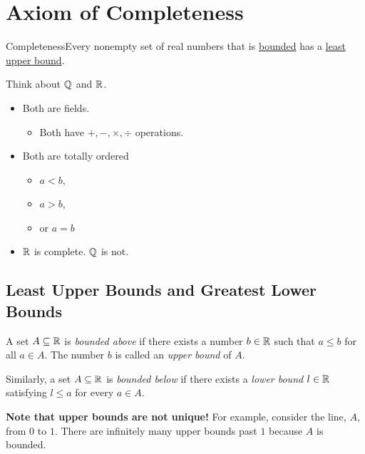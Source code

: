 \setcounter{section}{2}
\renewcommand{\theenumi}{\arabic{enumi}}
\renewcommand{\labelenumi}{\theenumi.}
\section{Axiom of Completeness}

\begin{axiom}
    {Completeness}Every nonempty set of real numbers that is \hyperref[def:1.3.1]{bounded} has a \hyperref[def:1.3.2]{least upper bound}.
\end{axiom}

Think about \(\mathbb{Q}\) and \(\mathbb{R}\).
\begin{itemize}
    \item Both are fields.
          \begin{itemize}
              \item Both have \(+,-,\times,\div\) operations.
          \end{itemize}
    \item Both are totally ordered
          \begin{itemize}
              \item \(a < b\),
              \item \(a > b\),
              \item or \(a = b\)
          \end{itemize}
    \item \(\mathbb{R}\) is complete. \(\mathbb{Q}\) is not.
\end{itemize}

\subsection{Least Upper Bounds and Greatest Lower Bounds}

\begin{definition}
    A set \(A \subseteq \mathbb{R}\) is \textit{bounded above} if there exists a number \(b \in \mathbb{R}\) such that \(a \leq b\) for all \(a \in A\). The number \(b\) is called an \textit{upper bound} of \(A\).

    Similarly, a set \(A \subseteq \mathbb{R}\) is \textit{bounded below} if there exists a \textit{lower bound} \(l \in \mathbb{R}\) satisfying \(l \leq a\) for every \(a \in A\).
\end{definition}

\textbf{Note that upper bounds are not unique!} For example, consider the line, \(A\), from \(0\) to \(1\). There are infinitely many upper bounds past \(1\) because \(A\) is bounded.

